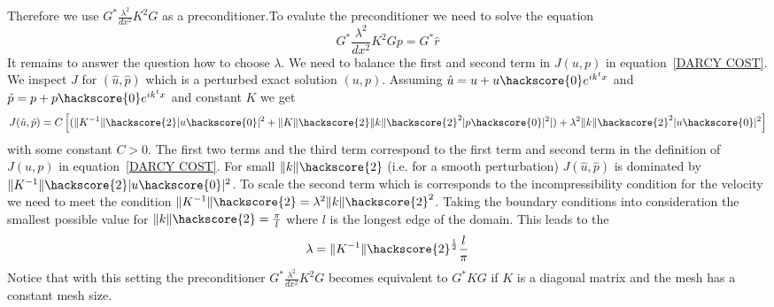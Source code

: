 Therefore we use $G^* \frac{\lambda^2}{dx^2} K^2 G$ as a preconditioner.To evalute the preconditioner
we need to solve the equation
\begin{equation}\label{UPDATE P}
 G^* \frac{\lambda^2}{dx^2} K^2 G p =  G^* \hat{r}
\end{equation}
It remains to answer the question how to choose $\lambda$. We need to balance the first and second
term in $J(u,p)$ in equation~\ref{DARCY COST}. We inspect $J$ for 
$(\hat{u}, \hat{p})$ which is a perturbed exact solution $(u,p)$.   
Assuming $\hat{u}=u+u\hackscore{0}e^{ik^tx}$
and $\hat{p}=p+p\hackscore{0}e^{ik^tx}$ and constant $K$ we get 
\begin{equation}
J(\hat{u},\hat{p}) = C \left[ ( \|K^{-1}\|\hackscore{2} |u\hackscore{0}|^2 + \|K\|\hackscore{2} \|k\|\hackscore{2}^2 |p\hackscore{0}|^2| )
+ \lambda^2 \|k\|\hackscore{2}^2 |u\hackscore{0}|^2  \right]
\end{equation} 
with some constant $C>0$. The first two terms and the third term correspond to the first term and
second term in the definition of $J(u,p)$ in equation~\ref{DARCY COST}. For small $\|k\|\hackscore{2}$
(i.e. for a smooth perturbation) $J(\hat{u},\hat{p})$ is dominated by $\|K^{-1}\|\hackscore{2} |u\hackscore{0}|^2$.
To scale the second term which is corresponds to the incompressibility condition for the velocity
we need to meet the condition $\|K^{-1}\|\hackscore{2} =  \lambda^2 \|k\|\hackscore{2}^2$. 
Taking the boundary conditions into consideration the smallest possible value for $\|k\|\hackscore{2} = \frac{\pi}{l}$ where $l$ is the longest edge of the domain. This leads to the 
\begin{equation}\label{DARCY LAMBDA}
\lambda = \|K^{-1}\|\hackscore{2}^{\frac{1}{2}} \frac{l}{\pi}
\end{equation} 
Notice that with this setting the preconditioner $G^* \frac{\lambda^2}{dx^2} K^2 G$ becomes 
equivalent to $G^* K G$ if $K$ is a diagonal matrix and the mesh has a constant mesh size.

